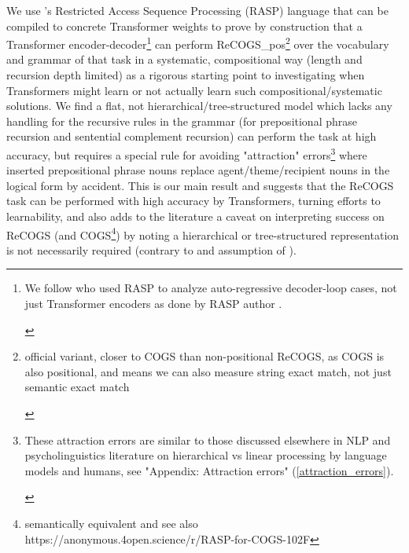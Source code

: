 \documentclass[11pt]{article}
\begin{document}
We use \cite{Weiss2021}'s Restricted Access Sequence Processing (RASP) language that can be compiled to concrete Transformer weights to prove by construction that a Transformer encoder-decoder\footnote{\begin{footnotesize}We follow \cite{Zhou2024} who used RASP to analyze auto-regressive decoder-loop cases, not just Transformer encoders as done by RASP author \cite{Weiss2021}.\end{footnotesize}} can perform ReCOGS\_pos\footnote{\begin{footnotesize}official variant, closer to COGS than non-positional ReCOGS, as COGS is also positional, and means we can also measure string exact match, not just semantic exact match\end{footnotesize}} over the vocabulary and grammar of that task in a systematic, compositional way (length and recursion depth limited) as a rigorous starting point to investigating when Transformers might learn or not actually learn such compositional/systematic solutions. We find a flat, not hierarchical/tree-structured model which lacks any handling for the recursive rules in the grammar (for prepositional phrase recursion and sentential complement recursion) can perform the task at high accuracy, but requires a special rule for avoiding "attraction" errors\footnote{\begin{footnotesize}These attraction errors are similar to those discussed elsewhere in NLP and psycholinguistics literature on hierarchical vs linear processing by language models and humans, see "Appendix: Attraction errors" (\ref{attraction_errors}).\end{footnotesize}} where inserted prepositional phrase nouns replace agent/theme/recipient nouns in the logical form by accident. This is our main result and suggests that the ReCOGS task can be performed with high accuracy by Transformers, turning efforts to learnability, and also adds to the literature a caveat on interpreting success on ReCOGS (and COGS\footnote{semantically equivalent and see also https://anonymous.4open.science/r/RASP-for-COGS-102F}) by noting a hierarchical or tree-structured representation is not necessarily required (contrary to \cite{KimLinzen2020} and assumption of \cite{murty2022characterizingintrinsiccompositionalitytransformers}).
\end{document}
